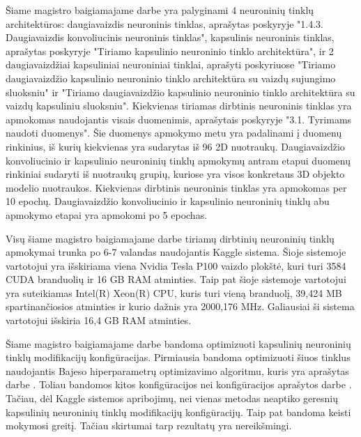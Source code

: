
Šiame magistro baigiamajame darbe yra palyginami 4 neuroninių tinklų architektūros: daugiavaizdis neuroninis tinklas, aprašytas poskyryje "1.4.3. Daugiavaizdis konvoliucinis neuroninis tinklas", kapsulinis neuroninis tinklas, aprašytas poskyryje "Tiriamo kapsulinio neuroninio tinklo architektūra", ir 2 daugiavaizdžiai kapsuliniai neuroniniai tinklai, aprašyti poskyriuose "Tiriamo daugiavaizdžio kapsulinio neuroninio tinklo architektūra su vaizdų sujungimo sluoksniu" ir "Tiriamo daugiavaizdžio kapsulinio neuroninio tinklo architektūra su vaizdų kapsuliniu sluoksniu". Kiekvienas tiriamas dirbtinis neuroninis tinklas yra apmokomas naudojantis visais duomenimis, aprašytais poskyryje "3.1. Tyrimams naudoti duomenys". Šie duomenys apmokymo metu yra padalinami į duomenų rinkinius, iš kurių kiekvienas yra sudarytas iš 96 2D nuotraukų. Daugiavaizdžio konvoliucinio ir kapsulinio neuroninių tinklų apmokymų antram etapui duomenų rinkiniai sudaryti iš nuotraukų grupių, kuriose yra visos konkretaus 3D objekto modelio nuotraukos. Kiekvienas dirbtinis neuroninis tinklas yra apmokomas per 10 epochų. Daugiavaizdžio konvoliucinio ir kapsulinio neuroninių tinklų abu apmokymo etapai yra apmokomi po 5 epochas.

Visų šiame magistro baigiamajame darbe tiriamų dirbtinių neuroninių tinklų apmokymai trunka po 6-7 valandas naudojantis Kaggle sistema. Šioje sistemoje vartotojui yra išskiriama viena Nvidia Tesla P100 vaizdo plokštė, kuri turi 3584 CUDA branduolių ir 16 GB RAM atminties. Taip pat šioje sistemoje vartotojui yra suteikiamas Intel(R) Xeon(R) CPU, kuris turi vieną branduolį, 39,424 MB spartinančiosios atminties ir kurio dažnis yra 2000,176 MHz. Galiausiai ši sistema vartotojui išskiria 16,4 GB RAM atminties.

Šiame magistro baigiamajame darbe bandoma optimizuoti kapsulinių neuroninių tinklų modifikacijų konfigūracijas. Pirmiausia bandoma optimizuoti šiuos tinklus naudojantis Bajeso hiperparametrų optimizavimo algoritmu, kuris yra aprašytas darbe \cite{bayes}. Toliau bandomos kitos konfigūracijos nei konfigūracijos aprašytos darbe \cite{capsNet}. Tačiau, dėl Kaggle sistemos apribojimų, nei vienas metodas neaptiko geresnių kapsulinių neuroninių tinklų modifikacijų konfigūracijų. Taip pat bandoma 
keisti mokymosi greitį. Tačiau skirtumai tarp rezultatų yra nereikšmingi.

